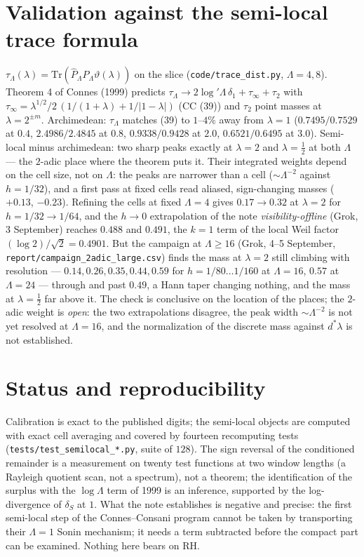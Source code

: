 \documentclass[11pt]{article}
\begin{document}
\section{Validation against the semi-local trace formula}
$\tau_\Lambda(\lambda)=\mathrm{Tr}(\hat P_\Lambda P_\Lambda\vartheta(\lambda))$ on the slice (\texttt{code/trace\_dist.py}, $\Lambda=4,8$). Theorem 4 of Connes (1999) predicts $\tau_\Lambda\to2\log'\Lambda\,\delta_1+\tau_\infty+\tau_2$ with $\tau_\infty=\lambda^{1/2}/2\,(1/(1+\lambda)+1/|1-\lambda|)$ (CC (39)) and $\tau_2$ point masses at $\lambda=2^{\pm m}$. Archimedean: $\tau_\Lambda$ matches (39) to $1$--$4\%$ away from $\lambda=1$ ($0.7495/0.7529$ at $0.4$, $2.4986/2.4845$ at $0.8$, $0.9338/0.9428$ at $2.0$, $0.6521/0.6495$ at $3.0$). Semi-local minus archimedean: two sharp peaks exactly at $\lambda=2$ and $\lambda=\tfrac12$ at both $\Lambda$ --- the $2$-adic place where the theorem puts it. Their integrated weights depend on the cell size, not on $\Lambda$: the peaks are narrower than a cell ($\sim\Lambda^{-2}$ against $h=1/32$), and a first pass at fixed cells read aliased, sign-changing masses ($+0.13$, $-0.23$). Refining the cells at fixed $\Lambda=4$ gives $0.17\to0.32$ at $\lambda=2$ for $h=1/32\to1/64$, and the $h\to0$ extrapolation of the note \emph{visibility-offline} (Grok, 3 September) reaches $0.488$ and $0.491$, the $k=1$ term of the local Weil factor $(\log2)/\sqrt2=0.4901$. But the campaign at $\Lambda\ge16$ (Grok, 4--5 September, \texttt{report/campaign\_2adic\_large.csv}) finds the mass at $\lambda=2$ still climbing with resolution --- $0.14,0.26,0.35,0.44,0.59$ for $h=1/80\ldots1/160$ at $\Lambda=16$, $0.57$ at $\Lambda=24$ --- through and past $0.49$, a Hann taper changing nothing, and the mass at $\lambda=\tfrac12$ far above it. The check is conclusive on the location of the places; the $2$-adic weight is \emph{open}: the two extrapolations disagree, the peak width $\sim\Lambda^{-2}$ is not yet resolved at $\Lambda=16$, and the normalization of the discrete mass against $d^*\lambda$ is not established.

\section*{Status and reproducibility}
Calibration is exact to the published digits; the semi-local objects are computed with exact cell averaging and covered by fourteen recomputing tests (\texttt{tests/test\_semilocal\_*.py}, suite of $128$). The sign reversal of the conditioned remainder is a measurement on twenty test functions at two window lengths (a Rayleigh quotient scan, not a spectrum), not a theorem; the identification of the surplus with the $\log\Lambda$ term of 1999 is an inference, supported by the log-divergence of $\delta_S$ at $1$. What the note establishes is negative and precise: the first semi-local step of the Connes--Consani program cannot be taken by transporting their $\Lambda=1$ Sonin mechanism; it needs a term subtracted before the compact part can be examined. Nothing here bears on RH.
\end{document}
